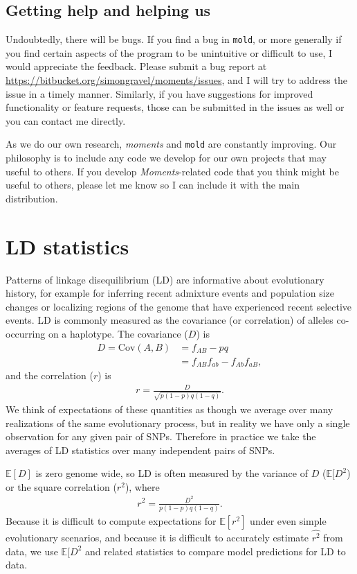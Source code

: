 \documentclass[11pt]{article}
\newcommand{\comment}[1]{{\color{blue}APR: #1}}
\newcommand{\mold}{\texttt{mold}\xspace}
\newcommand{\E}{\mathbb{E}}
\begin{document}

\subsection{Getting help and helping us}

Undoubtedly, there will be bugs.
If you find a bug in \mold, or more generally if you find certain aspects of the program to be unintuitive or difficult to use, I would appreciate the feedback.
Please submit a bug report at \url{https://bitbucket.org/simongravel/moments/issues}, and I will try to address the issue in a timely manner.
Similarly, if you have suggestions for improved functionality or feature requests, those can be submitted in the issues as well or you can contact me directly.

As we do our own research, \textit{moments} and \mold are constantly improving.
Our philosophy is to include any code we develop for our own projects that may useful to others.
If you develop \textit{Moments}-related code that you think might be useful to others, please let me know so I can include it with the main distribution.

\section{LD statistics}

Patterns of linkage disequilibrium (LD) are informative about evolutionary history, for example for inferring recent admixture events and population size changes or localizing regions of the genome that have experienced recent selective events.
LD is commonly measured as the covariance (or correlation) of alleles co-occurring on a haplotype.
The covariance ($D$) is
\begin{align*}
D = \text{Cov}(A,B) & = f_{AB} - pq \\ & = f_{AB}f_{ab} - f_{Ab}f_{aB},
\end{align*}
and the correlation ($r$) is
\begin{align*}
r = \frac{D}{\sqrt{p(1-p)q(1-q)}} .
\end{align*}
We think of expectations of these quantities as though we average over many realizations of the same evolutionary process, but in reality we have only a single observation for any given pair of SNPs.
Therefore in practice we take the averages of LD statistics over many independent pairs of SNPs.

$\E[D]$ is zero genome wide, so LD is often measured by the variance of $D$ ($\E[D^2$) or the square correlation ($r^2$), where
\begin{align*}
r^2 = \frac{D^2}{p(1-p)q(1-q)}.
\end{align*}
Because it is difficult to compute expectations for $\E[r^2]$ under even simple evolutionary scenarios, and because it is difficult to accurately estimate $\widehat{r^2}$ from data, we use $\E[D^2$ and related statistics to compare model predictions for LD to data.
\end{document}
